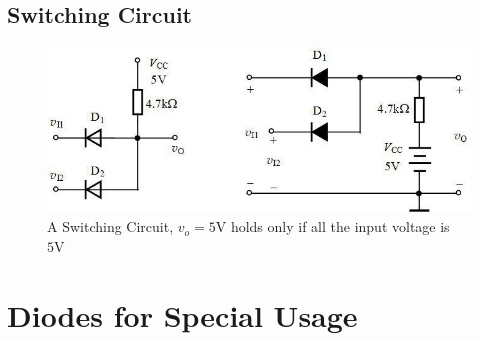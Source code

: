 \subsection{Switching Circuit}

\begin{figure}[H]
  \centering
  \includegraphics[width=0.9\linewidth]{figures/SwitchCircuit}
  \caption{A Switching Circuit, $v_o = 5 \mathrm{V}$ holds only if all the input voltage is $5 \mathrm{V}$}
  \label{fig:}
\end{figure}

\section{Diodes for Special Usage}



